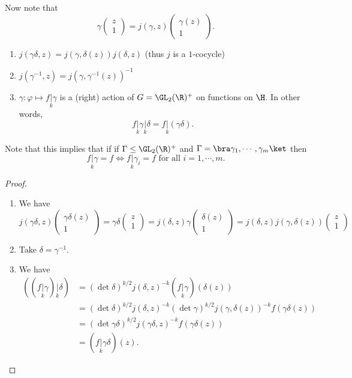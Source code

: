 \documentclass[a4paper]{article}
\begin{document}
Now note that
\[
  \gamma
  \begin{pmatrix}
    z\\1
  \end{pmatrix}
  = j(\gamma, z)
  \begin{pmatrix}
    \gamma(z)\\1
  \end{pmatrix}.\tag{$*$}
\]
\begin{prop}\leavevmode
  \begin{enumerate}
    \item $j(\gamma\delta, z) = j(\gamma, \delta(z)) j(\delta, z)$ (thus $j$ is a $1$-cocycle)
    \item $j(\gamma^{-1}, z) = j (\gamma, \gamma^{-1}(z))^{-1}$
    \item $\gamma: \varphi \mapsto f\underset{k}{|} \gamma$ is a (right) action of $G = \GL_2(\R)^+$ on functions on $\H$. In other words, 
      \[
        f\underset{k}{|} \gamma \underset{k}{|} \delta = f\underset{k}{|}(\gamma\delta).
      \]
  \end{enumerate}
\end{prop}
Note that this implies that if if $\Gamma \leq \GL_2(\R)^+$ and $\Gamma = \bra \gamma_1, \cdots, \gamma_m\ket$ then
\[
  f\underset{k}{|} \gamma = f\Longleftrightarrow f\underset{k}{|} \gamma_i = f\text{ for all }i = 1, \cdots, m.
\]
\begin{proof}\leavevmode
  \begin{enumerate}
    \item We have
      \[
        j(\gamma\delta, z)
        \begin{pmatrix}
          \gamma\delta(z)\\
          1
        \end{pmatrix} =
        \gamma\delta
        \begin{pmatrix}
          z\\1
        \end{pmatrix}
        =
        j(\delta, z) \gamma
        \begin{pmatrix}
          \delta(z)\\
          1
        \end{pmatrix}
        =
        j(\delta, z) j(\gamma, \delta(z))
        \begin{pmatrix}
          z\\1
        \end{pmatrix}
      \]
    \item Take $\delta = \gamma^{-1}$.
    \item We have
      \begin{align*}
        ((f\underset{k}{|} \gamma) \underset{k}{|} \delta) &= (\det \delta)^{k/2} j(\delta, z)^{-k} (f\underset{k}{|} \gamma) (\delta(z))\\
        &= (\det \delta)^{k/2} j(\delta, z)^{-k} (\det \gamma)^{k/2} j(\gamma, \delta(z))^{-k} f(\gamma\delta(z))\\
        &= (\det \gamma \delta)^{k/2} j(\gamma \delta, z)^{-k} f(\gamma\delta(z))\\
        &= (f\underset{k}{|} \gamma\delta) (z).
      \end{align*}
  \end{enumerate}
\end{proof}
\end{document}
